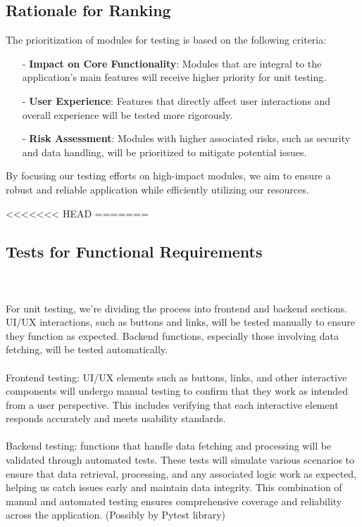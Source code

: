 \documentclass[12pt, titlepage]{article}
\begin{document}
\subsection{Rationale for Ranking}
The prioritization of modules for testing is based on the following criteria:
\begin{itemize}
    \item[-] \textbf{Impact on Core Functionality}: Modules that are integral to the application’s main features will receive higher priority for unit testing.
    \item[-] \textbf{User Experience}: Features that directly affect user interactions and overall experience will be tested more rigorously.
    \item[-] \textbf{Risk Assessment}: Modules with higher associated risks, such as security and data handling, will be prioritized to mitigate potential issues.
\end{itemize}

\noindent By focusing our testing efforts on high-impact modules, we aim to ensure a robust and reliable application while efficiently utilizing our resources.

<<<<<<< HEAD
\newpage
=======

\subsection{Tests for Functional Requirements}

\\\\
For unit testing, we’re dividing the process into frontend and backend sections. UI/UX interactions, such as buttons and links, will be tested manually to ensure they function as expected. Backend functions, especially those involving data fetching, will be tested automatically.\\\\
Frontend testing: UI/UX elements such as buttons, links, and other interactive components will undergo manual testing to confirm that they work as intended from a user perspective. This includes verifying that each interactive element responds accurately and meets usability standards.\\\\
Backend testing: functions that handle data fetching and processing will be validated through automated tests. These tests will simulate various scenarios to ensure that data retrieval, processing, and any associated logic work as expected, helping us catch issues early and maintain data integrity. This combination of manual and automated testing ensures comprehensive coverage and reliability across the application. (Possibly by Pytest library)
\end{document}
